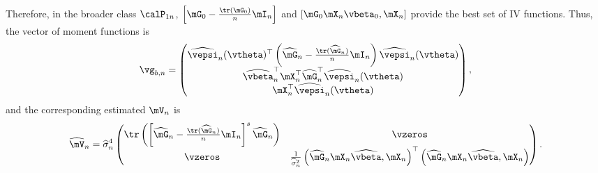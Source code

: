 \documentclass[english,12pt]{book}\usepackage[]{graphicx}\usepackage[]{xcolor}
\begin{document}
Therefore, in the broader class $\calP_{1n}$, $\left[\mG_0 - \frac{\tr\left(\mG_0\right)}{n}\mI_n\right]$ and $\left[\mG_0\mX_n\vbeta_0, \mX_n\right]$ provide the best set of IV functions. Thus, the vector of moment functions is
\begin{equation*}
\vg_{b, n} = \begin{pmatrix}
               \widehat{\vepsi}_n(\vtheta)^\top\left(\widehat{\mG}_n - \frac{\tr(\widehat{\mG}_n)}{n}\mI_n \right)\widehat{\vepsi}_n(\vtheta) \\
               \widehat{\vbeta}_n^\top\mX_n ^\top\widehat{\mG}_n^\top\widehat{\vepsi}_n(\vtheta)\\
               \mX_n^\top\widehat{\vepsi}_n(\vtheta)
              \end{pmatrix}, 
\end{equation*}
%
and the corresponding estimated $\mV_n$ is
\begin{equation}
\widehat{\mV}_n = \widehat{\sigma}^4_n
\begin{pmatrix}
\tr\left(\left[\widehat{\mG}_n - \frac{\tr(\widehat{\mG}_n)}{n}\mI_n \right]^s\widehat{\mG}_n\right) & \vzeros \\
\vzeros & \frac{1}{\widehat{\sigma}_n^2}\left(\widehat{\mG}_n\mX_n\widehat{\vbeta}, \mX_n\right)^\top \left(\widehat{\mG}_n\mX_n\widehat{\vbeta}, \mX_n\right)
\end{pmatrix}.
\end{equation}
\end{document}
